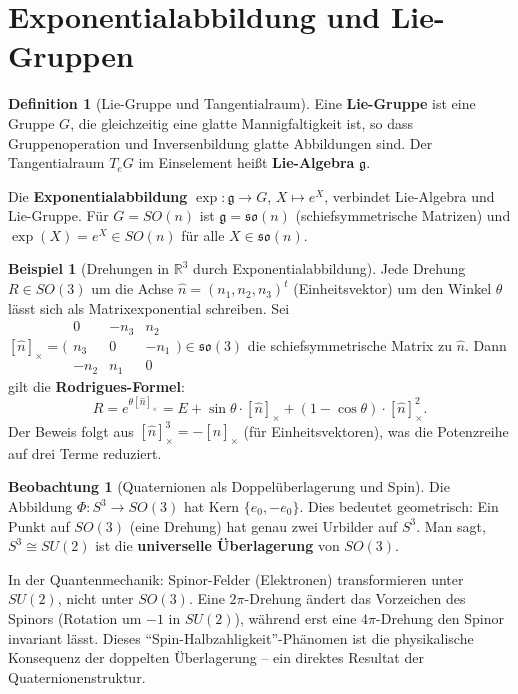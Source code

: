 ﻿\documentclass[a4paper,12pt]{report}
\theoremstyle{definition}
\newtheorem{definition}{Definition}
\newtheorem{beispiel}{Beispiel}
\newtheorem{beobachtung}{Beobachtung}
\begin{document}

\section{Exponentialabbildung und Lie-Gruppen}

\begin{definition}[Lie-Gruppe und Tangentialraum]
    Eine \textbf{Lie-Gruppe} ist eine Gruppe $G$, die gleichzeitig eine
    glatte Mannigfaltigkeit ist, so dass Gruppenoperation und Inversenbildung
    glatte Abbildungen sind. Der Tangentialraum $T_e G$ im Einselement
    heißt \textbf{Lie-Algebra} $\mathfrak{g}$.

    Die \textbf{Exponentialabbildung} $\exp : \mathfrak{g} \to G$,
    $X \mapsto e^X$, verbindet Lie-Algebra und Lie-Gruppe. Für
    $G = SO(n)$ ist $\mathfrak{g} = \mathfrak{so}(n)$ (schiefsymmetrische
    Matrizen) und $\exp(X) = e^X \in SO(n)$ für alle $X \in \mathfrak{so}(n)$.
\end{definition}

\begin{beispiel}[Drehungen in $\mathbb{R}^3$ durch Exponentialabbildung]
    Jede Drehung $R \in SO(3)$ um die Achse $\hat{n} = (n_1, n_2, n_3)^t$
    (Einheitsvektor) um den Winkel $\theta$ lässt sich als
    Matrixexponential schreiben. Sei
    $[\hat{n}]_\times = \bigl(\begin{smallmatrix}
    0 & -n_3 & n_2 \\ n_3 & 0 & -n_1 \\ -n_2 & n_1 & 0
    \end{smallmatrix}\bigr) \in \mathfrak{so}(3)$
    die schiefsymmetrische Matrix zu $\hat{n}$. Dann gilt die
    \textbf{Rodrigues-Formel}:
    \[
        R = e^{\theta [\hat{n}]_\times}
        = E + \sin\theta \cdot [\hat{n}]_\times
        + (1 - \cos\theta) \cdot [\hat{n}]_\times^2.
    \]
    Der Beweis folgt aus $[\hat{n}]_\times^3 = -[\hat{n}]_\times$
    (für Einheitsvektoren), was die Potenzreihe auf drei Terme reduziert.
\end{beispiel}

\begin{beobachtung}[Quaternionen als Doppelüberlagerung und Spin]
    Die Abbildung $\Phi : S^3 \to SO(3)$ hat Kern $\{e_0, -e_0\}$.
    Dies bedeutet geometrisch: Ein Punkt auf $SO(3)$ (eine Drehung)
    hat genau zwei Urbilder auf $S^3$. Man sagt, $S^3 \cong SU(2)$
    ist die \textbf{universelle Überlagerung} von $SO(3)$.

    In der Quantenmechanik: Spinor-Felder (Elektronen) transformieren
    unter $SU(2)$, nicht unter $SO(3)$. Eine $2\pi$-Drehung ändert
    das Vorzeichen des Spinors (Rotation um $-1$ in $SU(2)$), während
    erst eine $4\pi$-Drehung den Spinor invariant lässt. Dieses
    ``Spin-Halbzahligkeit''-Phänomen ist die physikalische Konsequenz
    der doppelten Überlagerung -- ein direktes Resultat der
    Quaternionenstruktur.
\end{beobachtung}
\end{document}
